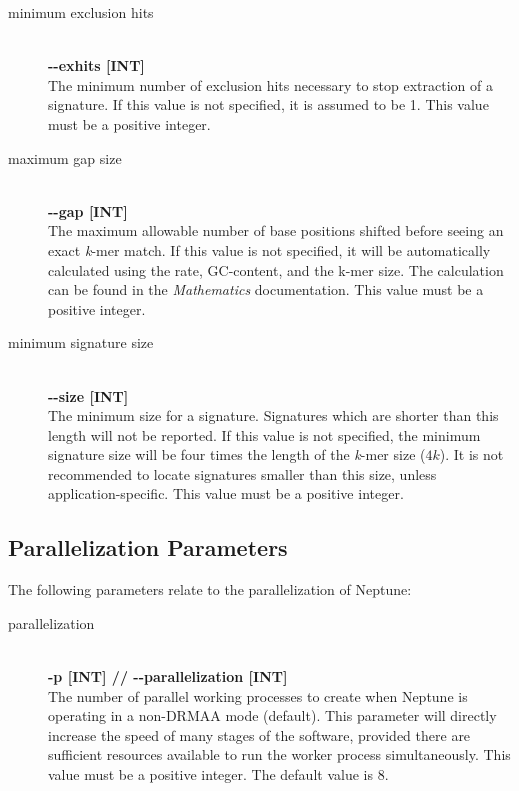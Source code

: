 \documentclass[a4paper,10pt]{article}
\begin{document}
\begin{description}
  \item[minimum exclusion hits] \hfill \\
  \textbf{-{}-exhits [INT]} \hfill \\
  The minimum number of exclusion hits necessary to stop extraction of a signature. If this value is not specified, it is assumed to be 1. This value must be a positive integer.
  
  \item[maximum gap size] \hfill \\
  \textbf{-{}-gap [INT]} \hfill \\
  The maximum allowable number of base positions shifted before seeing an exact \textit{k}-mer match. If this value is not specified, it will be automatically calculated using the rate, GC-content, and the k-mer size. The calculation can be found in the \textit{Mathematics} documentation. This value must be a positive integer.
  
  \item[minimum signature size] \hfill \\
  \textbf{-{}-size [INT]} \hfill \\
  The minimum size for a signature. Signatures which are shorter than this length will not be reported. If this value is not specified, the minimum signature size will be four times the length of the \textit{k}-mer size (\(4k\)). It is not recommended to locate signatures smaller than this size, unless application-specific. This value must be a positive integer.

\end{description}
  
\subsection{Parallelization Parameters}

The following parameters relate to the parallelization of Neptune:

\begin{description}

  \item[parallelization] \hfill \\
  \textbf{-p [INT] // -{}-parallelization [INT]} \hfill \\
  The number of parallel working processes to create when Neptune is operating in a non-DRMAA mode (default). This parameter will directly increase the speed of many stages of the software, provided there are sufficient resources available to run the worker process simultaneously. This value must be a positive integer. The default value is 8.

\end{description}
  
\end{document}
